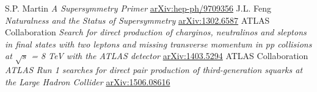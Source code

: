 \begin{thebibliography}{xxx}
 S.P. Martin \textit{A Supersymmetry Primer} \href{https://arxiv.org/abs/hep-ph/9709356}{arXiv:hep-ph/9709356}
 J.L. Feng  \textit{Naturalness and the Status of Supersymmetry} \href{https://arxiv.org/abs/1302.6587}{arXiv:1302.6587}
 ATLAS Collaboration \textit{Search for direct production of charginos, neutralinos and sleptons in final states with two leptons and missing transverse momentum in pp collisions at $\sqrt{s}$ = 8 TeV with the ATLAS detector} \href{https://arxiv.org/abs/1403.5294}{arXiv:1403.5294}
 ATLAS Collaboration \textit{ATLAS Run 1 searches for direct pair production of third-generation squarks at the Large Hadron Collider} \href{https://arxiv.org/abs/1506.08616}{arXiv:1506.08616}
\end{thebibliography}